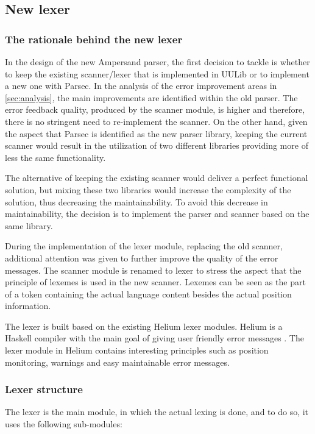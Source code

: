 
\subsection{New lexer}
\label{design:new-lexer}

\subsubsection{The rationale behind the new lexer}
In the design of the new Ampersand parser, the first decision to tackle is whether to keep the existing scanner/lexer that is implemented in UULib or to implement a new one with Parsec.
In the analysis of the error improvement areas in \autoref{sec:analysis}, the main improvements are identified within the old parser.
The error feedback quality, produced by the scanner module, is higher and therefore, there is no stringent need to re-implement the scanner.
On the other hand, given the aspect that Parsec is identified as the new parser library, keeping the current scanner would result in the utilization of two different libraries providing more of less the same functionality.

The alternative of keeping the existing scanner would deliver a perfect functional solution, but mixing these two libraries would increase the complexity of the solution, thus decreasing the maintainability.
To avoid this decrease in maintainability, the decision is to implement the parser and scanner based on the same library.

During the implementation of the lexer module, replacing the old scanner, additional attention was given to further improve the quality of the error messages.
The scanner module is renamed to lexer to stress the aspect that the principle of lexemes is used in the new scanner.
Lexemes can be seen as the part of a token containing the actual language content besides the actual position information.

The lexer is built based on the existing Helium lexer modules. 
Helium is a Haskell compiler with the main goal of giving user friendly error messages .
The lexer module in Helium contains interesting principles such as position monitoring, warnings and easy maintainable error messages.


\subsubsection{Lexer structure}
The lexer is the main module, in which the actual lexing is done, and to do so, it uses the following sub-modules:

